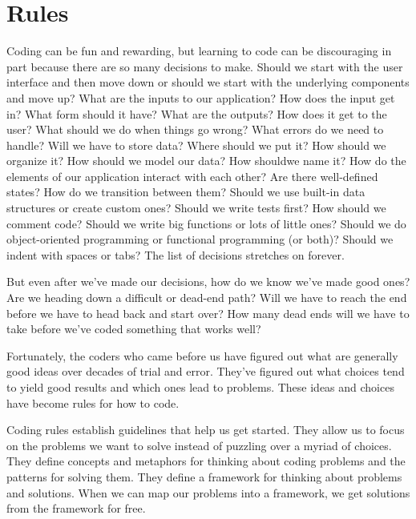 \chapter{Rules}
Coding can be fun and rewarding, but learning to code can be discouraging in
part because there are so many decisions to make. Should we start with the user
interface and then move down or should we start with the underlying components
and move up? What are the inputs to our application? How does the input get in?
What form should it have? What are the outputs? How does it get to the user?
What should we do when things go wrong? What errors do we need to handle? Will
we have to store data? Where should we put it? How should we organize it? How
should we model our data? How shouldwe name it? How do the elements of our
application interact with each other? Are there well-defined states? How do we
transition between them? Should we use built-in data structures or create
custom ones? Should we write tests first? How should we comment code? Should we
write big functions or lots of little ones? Should we do object-oriented
programming or functional programming (or both)? Should we indent with spaces
or tabs? The list of decisions stretches on forever.

But even after we've made our decisions, how do we know we've made good ones?
Are we heading down a difficult or dead-end path? Will we have to reach the end
before we have to head back and start over? How many dead ends will we have to
take before we've coded something that works well?

Fortunately, the coders who came before us have figured out what are generally
good ideas over decades of trial and error. They've figured out what choices
tend to yield good results and which ones lead to problems. These ideas and
choices have become rules for how to code.

Coding rules establish guidelines that help us get started. They allow us to
focus on the problems we want to solve instead of puzzling over a myriad of
choices. They define concepts and metaphors for thinking about coding problems
and the patterns for solving them. They define a framework for thinking about
problems and solutions. When we can map our problems into a framework, we get
solutions from the framework for free.


